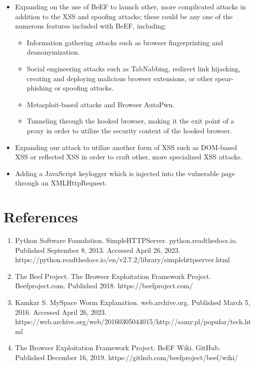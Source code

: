 \documentclass{article}
\begin{document}
    \begin{itemize}[labelindent=\parindent, leftmargin=*]
        \item Expanding on the use of BeEF to launch other, more complicated attacks in addition to the XSS and spoofing attacks; these could be any one of the numerous features included with BeEF, including:
        \vspace{-6pt}
        \begin{itemize}[parsep=4pt]
            \item Information gathering attacks such as browser fingerprinting and deanonymization.
            \item Social engineering attacks such as TabNabbing, redirect link hijacking, creating and deploying malicious browser extensions, or other spear-phishing or spoofing attacks.
            \item Metasploit-based attacks and Browser AutoPwn.
            \item Tunneling through the hooked browser, making it the exit point of a proxy in order to utilize the security context of the hooked browser.
        \end{itemize}
        \vspace{-2pt}
        \item Expanding our attack to utilize another form of XSS such as DOM-based XSS or reflected XSS in order to craft other, more specialized XSS attacks.
        \item Adding a JavaScript keylogger which is injected into the vulnerable page through an XMLHttpRequest.
    \end{itemize}

    \section*{References}

    \begin{enumerate}[labelindent=\parindent, leftmargin=*]
        \item Python Software Foundation. SimpleHTTPServer. python.readthedocs.io. Published September 8, 2013. Accessed April 26, 2023. https://python.readthedocs.io/en/v2.7.2/library/simplehttpserver.html
        \item The Beef Project. The Browser Exploitation Framework Project. Beefproject.com. Published 2018. https://beefproject.com/
        \item Kamkar S. MySpace Worm Explanation. web.archive.org. Published March 5, 2016. Accessed April 26, 2023. https://web.archive.org/web/20160305044015/http://samy.pl/popular/tech.html
        \item The Browser Exploitation Framework Project. BeEF Wiki. GitHub. Published December 16, 2019. https://github.com/beefproject/beef/wiki/
    \end{enumerate}
\end{document}
